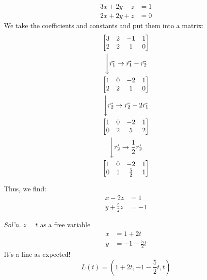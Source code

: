 \documentclass[../main.tex]{subfiles}
\begin{document}
\begin{example}[]
    \begin{align*}
        3x + 2y - z &= 1 \\
        2x + 2y + z & = 0
    \end{align*}
    We take the coefficients and constants and put them into a matrix:
    \begin{gather*}
        \begin{bmatrix}
            3 & 2 & -1 & 1 \\
            2 & 2 & 1 & 0
        \end{bmatrix} \\
        \Bigg\downarrow {\vec{r_1} \rightarrow \vec{r_1}-\vec{r_2}} \\
        \begin{bmatrix}
            1 & 0 & -2 & 1 \\
            2 & 2 & 1 & 0
        \end{bmatrix} \\
        \Bigg\downarrow {\vec{r_2} \rightarrow \vec{r_2}-2\vec{r_1}} \\
        \begin{bmatrix}
            1 & 0 & -2 & 1 \\
            0 & 2 & 5 & 2
        \end{bmatrix} \\
        \Bigg\downarrow {\vec{r_2} \rightarrow \frac{1}{2}\vec{r_2}} \\
        \begin{bmatrix}
            1 & 0 & -2 & 1 \\
            0 & 1 & \frac{5}{2} & 1
        \end{bmatrix}
    \end{gather*}

    Thus, we find:
    \begin{align*}
        x - 2z &= 1 \\
        y + \frac{5}{2}z &= -1
    \end{align*}

    \textit{Sol'n.} \( z = t \) as a free variable
    \begin{align*}
        x &= 1 + 2t \\
        y &= -1 - \frac{5}{2}t
    \end{align*}
    It's a line as expected!
    \[ L(t) = \left( 1+2t, -1-\frac{5}{2}t, t \right) \]
\end{example}
\end{document}
